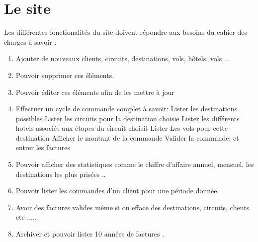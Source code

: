 \section{Le site}
Les diff\'erentes fonctionalit\'es du site doivent r\'epondre aux besoins du cahier des charges \`a savoir :

\begin{enumerate}
\item Ajouter de nouveaux clients, circuits, destinations, vols, h\^otels, vols ...
\item Pouvoir supprimer ces \'el\'ements.
\item Pouvoir \'editer ces \'el\'ements afin de les mettre \`a jour
\item Effectuer un cycle de commande complet \`a savoir:
\subitem Lister les destinations possibles
\subitem Lister les circuits pour la destination choisie
\subitem Lister les diff\'erents hotels associ\'es aux \'etapes du circuit choisit
\subitem Lister Les vols pour cette destination
\subitem Afficher le montant de la commande
\subitem Valider la commande, et entrer les factures
\item Pouvoir afficher des statistiques comme le chiffre d'affaire annuel, mensuel, les destinations les plus pris\'ees ..
\item Pouvoir lister les commandes d'un client pour une p\'eriode donn\'ee
\item Avoir des factures valides m\^eme si on efface des destinations, circuits, clients etc .....
\item Archiver et pouvoir lister 10 ann\'ees de factures .
\end{enumerate}